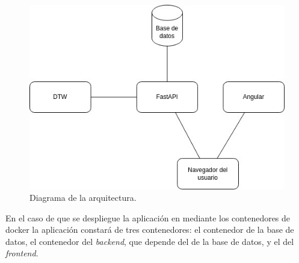 \begin{figure}
	\centering
	\includegraphics[width=0.7\linewidth]{img/DiagramaArq}
	\caption{Diagrama de la arquitectura.}
	\label{fig:diagramaarq}
\end{figure}

En el caso de que se despliegue la aplicación en mediante los contenedores de docker la aplicación constará de tres contenedores: el contenedor de la base de datos, el contenedor del \textit{backend}, que depende del de la base de datos, y el del \textit{frontend}.

